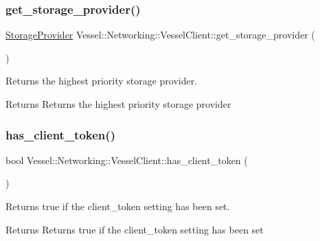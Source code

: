 \subsubsection{\texorpdfstring{get\+\_\+storage\+\_\+provider()}{get\_storage\_provider()}}
{\footnotesize\ttfamily \hyperlink{struct_vessel_1_1_types_1_1_storage_provider}{Storage\+Provider} Vessel\+::\+Networking\+::\+Vessel\+Client\+::get\+\_\+storage\+\_\+provider (\begin{DoxyParamCaption}{ }\end{DoxyParamCaption})}



Returns the highest priority storage provider. 

\begin{DoxyReturn}{Returns}
Returns the highest priority storage provider 
\end{DoxyReturn}
\mbox{\label{class_vessel_1_1_networking_1_1_vessel_client_af517d80b8e5a5941ee532faae46660be}} 
\subsubsection{\texorpdfstring{has\+\_\+client\+\_\+token()}{has\_client\_token()}}
{\footnotesize\ttfamily bool Vessel\+::\+Networking\+::\+Vessel\+Client\+::has\+\_\+client\+\_\+token (\begin{DoxyParamCaption}{ }\end{DoxyParamCaption})}



Returns true if the client\+\_\+token setting has been set. 

\begin{DoxyReturn}{Returns}
Returns true if the client\+\_\+token setting has been set 
\end{DoxyReturn}
\mbox{\label{class_vessel_1_1_networking_1_1_vessel_client_ac9236da3c448454791a1c0dff1103f8a}} 

